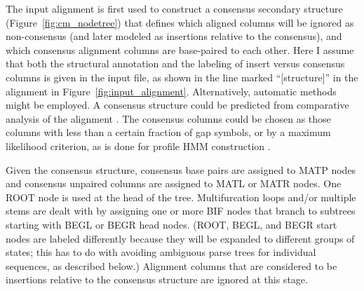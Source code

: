 \documentclass[11pt]{article}
\newif\ifdraft
\begin{document}
The input alignment is first used to construct a consensus secondary
structure (Figure~\ref{fig:cm_nodetree}) that defines which aligned
columns will be ignored as non-consensus (and later modeled as
insertions relative to the consensus), and which consensus alignment
columns are base-paired to each other. Here I assume that both the
structural annotation and the labeling of insert versus consensus
columns is given in the input file, as shown in the line marked
``[structure]'' in the alignment in Figure~\ref{fig:input_alignment}.
Alternatively, automatic methods might be employed. A consensus
structure could be predicted from comparative analysis of the
alignment \cite{Chiu91,Gutell92,Eddy94}.  The consensus columns could
be chosen as those columns with less than a certain fraction of gap
symbols, or by a maximum likelihood criterion, as is done for profile
HMM construction \cite{Krogh94,Durbin98}.

\ifdraft
\begin{figure}[t]
\begin{center}
\texttt{[image: Figures/cm\_nodetree]}
\end{center}
\caption{\textbf{The structural alignment is converted to a guide
tree.} Left: the consensus secondary structure is derived from the
annotated alignment in Figure~\ref{fig:input_alignment}. Numbers in
the circles indicate alignment column coordinates: e.g.  column 4 base
pairs with column 14, and so on. Right: the CM guide tree
corresponding to this consensus structure. The nodes of the tree are
numbered 1..24 in preorder traversal (see text). MATP, MATL, and MATR
nodes are associated with the columns they generate: e.g., node 6 is a
MATP (pair) node that is associated with the base-paired columns 4 and
14.}
\label{fig:cm_nodetree}
\end{figure}
\fi

Given the consensus structure, consensus base pairs are assigned to
MATP nodes and consensus unpaired columns are assigned to MATL or MATR
nodes. One ROOT node is used at the head of the tree.  Multifurcation
loops and/or multiple stems are dealt with by assigning one or more
BIF nodes that branch to subtrees starting with BEGL or BEGR head
nodes. (ROOT, BEGL, and BEGR start nodes are labeled differently
because they will be expanded to different groups of states; this has
to do with avoiding ambiguous parse trees for individual sequences, as
described below.) Alignment columns that are considered to be
insertions relative to the consensus structure are ignored at this
stage.
\end{document}
